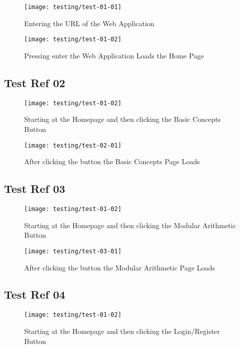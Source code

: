 \begin{figure}[H]
\centering
\texttt{[image: testing/test-01-01]}
\caption{Entering the URL of the Web Application}
\label{test-01-01}
\end{figure}

\begin{figure}[H]
\centering
\texttt{[image: testing/test-01-02]}
\caption{Pressing enter the Web Application Loads the Home Page}
\label{test-01-02}
\end{figure}

\subsection{Test Ref 02}

\begin{figure}[H]
\centering
\texttt{[image: testing/test-01-02]}
\caption{Starting at the Homepage and then clicking the Basic Concepts Button}
\label{test-02-01}
\end{figure}

\begin{figure}[H]
\centering
\texttt{[image: testing/test-02-01]}
\caption{After clicking the button the Basic Concepts Page Loads}
\label{test-02-02}
\end{figure}

\subsection{Test Ref 03}

\begin{figure}[H]
\centering
\texttt{[image: testing/test-01-02]}
\caption{Starting at the Homepage and then clicking the Modular Arithmetic Button}
\label{test-03-01}
\end{figure}

\begin{figure}[H]
\centering
\texttt{[image: testing/test-03-01]}
\caption{After clicking the button the Modular Arithmetic Page Loads}
\label{test-03-02}
\end{figure}

\subsection{Test Ref 04}

\begin{figure}[H]
\centering
\texttt{[image: testing/test-01-02]}
\caption{Starting at the Homepage and then clicking the Login/Register Button}
\label{test-04-01}
\end{figure}

